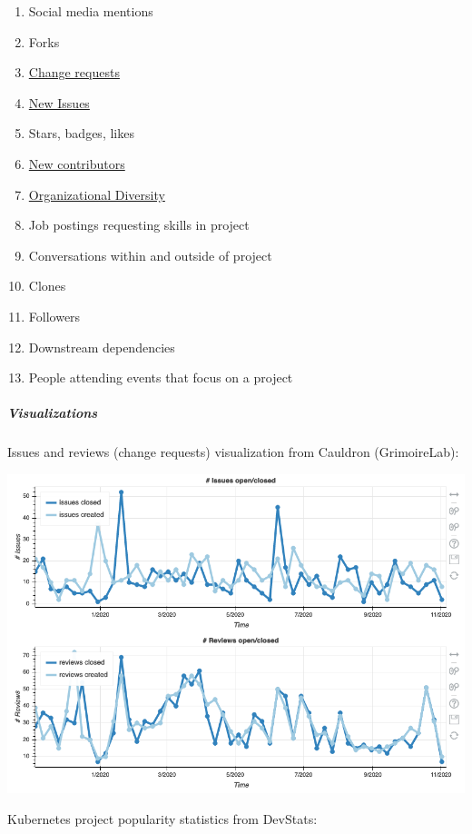 \begin{enumerate}
\def\labelenumi{\arabic{enumi}.}
\tightlist
\item
  Social media mentions
\item
  Forks
\item
  \href{https://chaoss.community/metric-change-requests/}{Change
  requests}
\item
  \href{https://chaoss.community/metric-issues-new/}{New Issues}
\item
  Stars, badges, likes
\item
  \href{https://chaoss.community/metric-new-contributors/}{New
  contributors}
\item
  \href{https://chaoss.community/metric-organizational-diversity/}{Organizational
  Diversity}
\item
  Job postings requesting skills in project
\item
  Conversations within and outside of project
\item
  Clones
\item
  Followers
\item
  Downstream dependencies
\item
  People attending events that focus on a project
\end{enumerate}

\hypertarget{visualizations}{%
\subparagraph{Visualizations}\label{visualizations}}

Issues and reviews (change requests) visualization from Cauldron
(GrimoireLab):

\includegraphics{images/project-popularity_issues-and-reviews.png}

Kubernetes project popularity statistics from DevStats:

